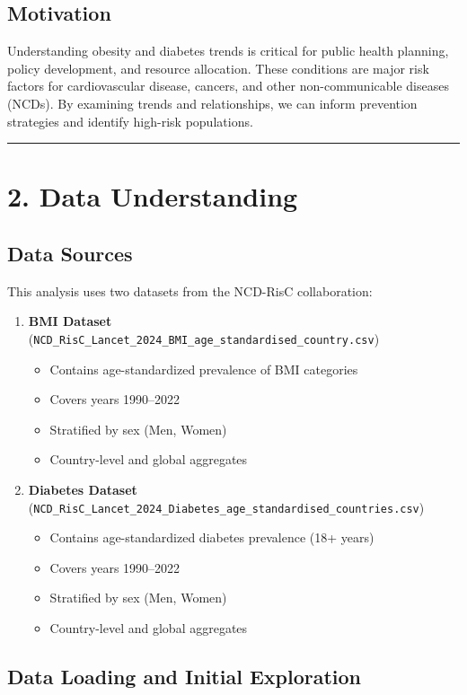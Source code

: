 \documentclass[
]{article}
\providecommand{\tightlist}{%
  \setlength{\itemsep}{0pt}\setlength{\parskip}{0pt}}
\begin{document}
\subsection{Motivation}\label{motivation}

Understanding obesity and diabetes trends is critical for public health
planning, policy development, and resource allocation. These conditions
are major risk factors for cardiovascular disease, cancers, and other
non-communicable diseases (NCDs). By examining trends and relationships,
we can inform prevention strategies and identify high-risk populations.

\begin{center}\rule{0.5\linewidth}{0.5pt}\end{center}

\section{2. Data Understanding}\label{data-understanding}

\subsection{Data Sources}\label{data-sources}

This analysis uses two datasets from the NCD-RisC collaboration:

\begin{enumerate}
\def\labelenumi{\arabic{enumi}.}
\tightlist
\item
  \textbf{BMI Dataset}
  (\texttt{NCD\_RisC\_Lancet\_2024\_BMI\_age\_standardised\_country.csv})

  \begin{itemize}
  \tightlist
  \item
    Contains age-standardized prevalence of BMI categories
  \item
    Covers years 1990--2022
  \item
    Stratified by sex (Men, Women)
  \item
    Country-level and global aggregates
  \end{itemize}
\item
  \textbf{Diabetes Dataset}
  (\texttt{NCD\_RisC\_Lancet\_2024\_Diabetes\_age\_standardised\_countries.csv})

  \begin{itemize}
  \tightlist
  \item
    Contains age-standardized diabetes prevalence (18+ years)
  \item
    Covers years 1990--2022
  \item
    Stratified by sex (Men, Women)
  \item
    Country-level and global aggregates
  \end{itemize}
\end{enumerate}

\subsection{Data Loading and Initial
Exploration}\label{data-loading-and-initial-exploration}
\end{document}
